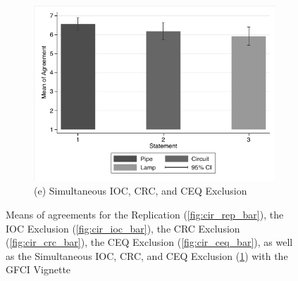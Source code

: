 \documentclass[egregdoesnotlikesansseriftitles,12pt]{scrartcl}
\begin{document}
\begin{landscape}
\begin{figure}[h!]
\begin{subfigure}[t]{0.28\textwidth}
      \includegraphics[scale=0.7]{figures/cir_com_bar.pdf}
      \caption{\textsf{\scriptsize(e) Simultaneous IOC, CRC, and CEQ Exclusion}}
      \label{fig:cir_com_bar}
   \end{subfigure}
   \caption{Means of agreements for the Replication (\ref{fig:cir_rep_bar}), the IOC Exclusion (\ref{fig:cir_ioc_bar}), the CRC Exclusion (\ref{fig:cir_crc_bar}), the CEQ Exclusion (\ref{fig:cir_ceq_bar}), as well as the Simultaneous IOC, CRC, and CEQ Exclusion (\ref{fig:cir_com_bar}) with the GFCI Vignette}\label{fig:cir}
\end{figure}
\end{landscape}
\end{document}
